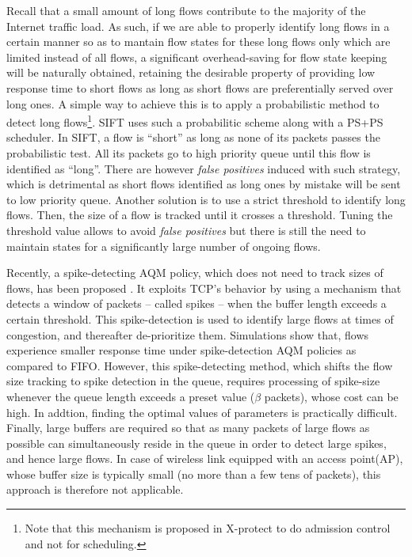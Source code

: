 \documentclass[preprint,12pt]{elsarticle}
\begin{document}
Recall that a small amount of long flows contribute to the majority of the Internet traffic load. As such, if we are able to properly identify long flows in a certain manner so as to mantain flow states for these long flows only which are limited instead of all flows, a significant overhead-saving for flow state keeping will be naturally obtained, retaining the desirable property of providing low response time to short flows as long as short flows are preferentially served over long ones. A simple way to achieve this is to apply a probabilistic method to detect long flows\footnote{Note that this mechanism is proposed in X-protect \cite{Kortebi04Xprotect} to do admission control  and not for scheduling.}\cite{Kortebi04Xprotect,Psounis05Sift}. SIFT \cite{Psounis05Sift} uses such a probabilitic scheme along with a PS+PS scheduler. In SIFT, a flow is ``short'' as long as none of its packets passes the probabilistic test. All its packets go to high priority queue until this flow is identified as ``long''. There are however \textit{false positives} induced with such strategy, which is detrimental as short flows identified as long ones by mistake will be sent to low priority queue. Another solution \cite{DivakaranCAP10} is to use a strict threshold to identify long flows. Then, the size of a flow is tracked until it crosses a threshold. Tuning the threshold value allows to avoid  \textit{false positives}  but there is still the need to maintain states for a significantly large number of ongoing flows. 

Recently, a spike-detecting AQM policy, which does not need to track sizes of flows, has been proposed  \cite{DivakaranAP11,Divakaran2012networks}. It exploits TCP's behavior by using a mechanism that detects a window of packets -- called spikes -- when the buffer length exceeds a certain threshold. This spike-detection is used to identify large flows at times of congestion, and thereafter de-prioritize them. Simulations  \cite{DivakaranAP11,Divakaran2012networks}  show   that, flows experience smaller response time under spike-detection AQM policies as compared to FIFO. However, this spike-detecting method, which shifts the flow size tracking to spike detection in the queue, requires processing of spike-size  whenever the queue length exceeds a preset value ($\beta$ packets), whose cost can be high. In addtion, finding the optimal values of parameters is practically difficult.%
Finally, large buffers are required so that as many packets of large flows as possible can simultaneously reside in the queue in order to detect large spikes, and hence large flows. In case of wireless link equipped with an access point(AP), whose buffer size is typically small (no more than a few tens of packets), this approach is therefore not applicable.
\end{document}
